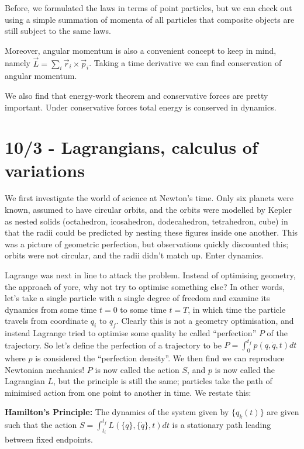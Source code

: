 \documentclass[10pt]{report}
\begin{document}
Before, we formulated the laws in terms of point particles, but we can check out using a simple summation of momenta of all particles that composite objects are still subject to the same laws. 

Moreover, angular momentum is also a convenient concept to keep in mind, namely $\vec{L}=\sum_i{\vec{r}_i\times\vec{p}_i}$. Taking a time derivative we can find conservation of angular momentum.

We also find that energy-work theorem and conservative forces are pretty important. Under conservative forces total energy is conserved in dynamics. 

\chapter{10/3 - Lagrangians, calculus of variations}

We first investigate the world of science at Newton's time. Only six planets were known, assumed to have circular orbits, and the orbits were modelled by Kepler as nested solids (octahedron, icosahedron, dodecahedron, tetrahedron, cube) in that the radii could be predicted by nesting these figures inside one another. This was a picture of geometric perfection, but observations quickly discounted this; orbits were not circular, and the radii didn't match up. Enter dynamics. 

Lagrange was next in line to attack the problem. Instead of optimising geometry, the approach of yore, why not try to optimise something else? In other words, let's take a single particle with a single degree of freedom and examine its dynamics from some time $t=0$ to some time $t=T$, in which time the particle travels from coordinate $q_i$ to $q_f$. Clearly this is not a geometry optimisation, and instead Lagrange tried to optimise some quality he called ``perfection'' $P$ of the trajectory. So let's define the perfection of a trajectory to be $P = \int_0^{t_f} p(q,\dot{q},t) dt$ where $p$ is considered the ``perfection density''. We then find we can reproduce Newtonian mechanics! $P$ is now called the action $S$, and $p$ is now called the Lagrangian $L$, but the principle is still the same; particles take the path of minimised action from one point to another in time. We restate this:

\begin{center}
    \textbf{Hamilton's Principle: } The dynamics of the system given by $\{q_k(t)\}$ are given such that the action $S = \int_{t_i}^{t_f} L(\{q\},\{\dot{q}\},t) dt$ is a stationary path leading between fixed endpoints.
\end{center}
\end{document}
